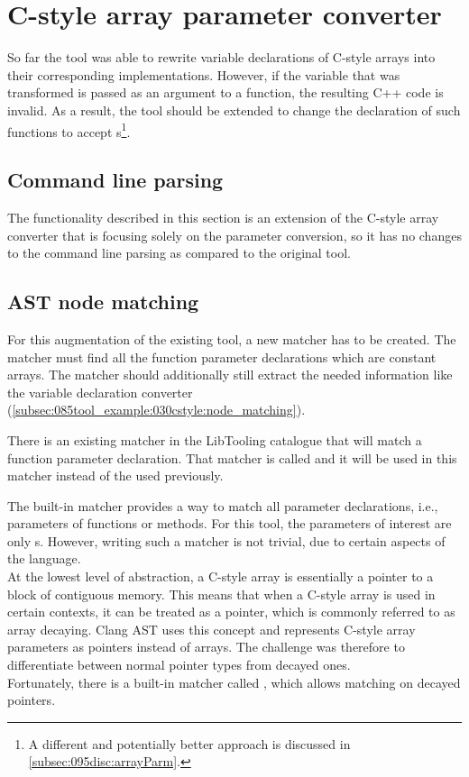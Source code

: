 
\section{C-style array parameter converter} \label{sec:080:035:cstyleArrayParm}

So far the tool was able to rewrite variable declarations of C-style arrays into their corresponding  implementations. However, if the variable that was transformed is passed as an argument to a function, the resulting C++ code is invalid.
As a result, the tool should be extended to change the declaration of such functions to accept s\footnote{
    A different and potentially better approach is discussed in \cref{subsec:095disc:arrayParm}.
}.

\subsection{Command line parsing}

The functionality described in this section is an extension of the C-style array converter that is focusing solely on the parameter conversion, so it has no changes to the command line parsing as compared to the original tool.

\pagebreak
\subsection{AST node matching}\label{subsec:085tool:ast_matching}

For this augmentation of the existing tool, a new matcher has to be created. The matcher must find all the function parameter declarations which are constant arrays. The matcher should additionally still extract the needed information like the variable declaration converter (\cref{subsec:085tool_example:030cstyle:node_matching}).

There is an existing matcher in the LibTooling catalogue that will match a function parameter declaration. That matcher is called  and it will be used in this matcher instead of the  used previously.

The built-in matcher  provides a way to match all parameter declarations, i.e., parameters of functions or methods. For this tool, the parameters of interest are only s. However, writing such a matcher is not trivial, due to certain aspects of the language.\\
At the lowest level of abstraction, a C-style array is essentially a pointer to a block of contiguous memory.
This means that when a C-style array is used in certain contexts, it can be treated as a pointer, which is commonly referred to as array decaying.
Clang AST uses this concept and represents C-style array parameters as pointers instead of arrays.
The challenge was therefore to differentiate between normal pointer types from decayed ones.\\
Fortunately, there is a built-in matcher called , which allows matching on decayed pointers.

